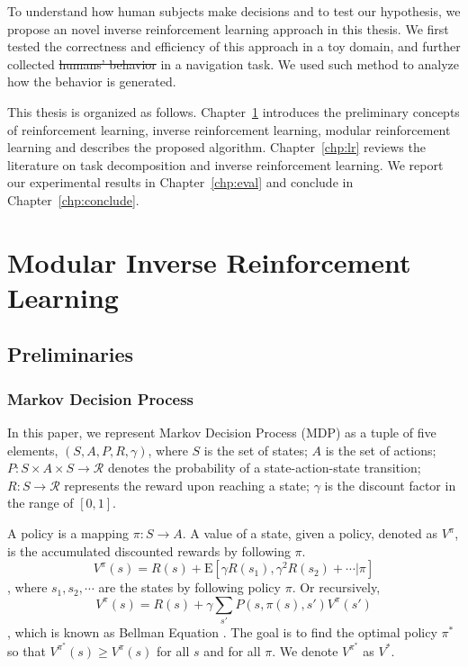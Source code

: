 \documentclass[12pt]{report}	%
\theoremstyle{definition}
\theoremstyle{remark}
\newcommand{\E}{\mathrm{E}}
\providecommand{\DIFadd}[1]{{\protect\color{blue}\uwave{#1}}} %
\providecommand{\DIFdel}[1]{{\protect\color{red}\sout{#1}}}                      %
\providecommand{\DIFaddbegin}{} %
\providecommand{\DIFaddend}{} %
\providecommand{\DIFdelbegin}{} %
\providecommand{\DIFdelend}{} %
\begin{document}
To understand how human subjects make decisions and to test our hypothesis, we
propose an novel inverse reinforcement learning approach in this thesis.
We first tested the correctness and efficiency of this approach in a toy domain,
and further collected \DIFdelbegin \DIFdel{humans' behavior }\DIFdelend \DIFaddbegin \DIFadd{human data }\DIFaddend in a navigation task. We used such method
to analyze how the behavior is generated.

This thesis is organized as follows. Chapter~\ref{chp:mirl} introduces the
preliminary concepts of reinforcement learning, inverse reinforcement learning,
modular reinforcement learning and describes the proposed algorithm.
Chapter~\ref{chp:lr} reviews the literature on task decomposition and inverse
reinforcement learning. We report our experimental results in
Chapter~\ref{chp:eval} and conclude in Chapter~\ref{chp:conclude}.


\chapter{Modular Inverse Reinforcement Learning}
\label{chp:mirl}
\section{Preliminaries}

\subsection{Markov Decision Process}

In this paper, we represent Markov Decision Process (MDP)
\cite{sutton1998introduction} as a tuple of
five elements, $(S, A, P, R, \gamma)$, where $S$ is the set of states; $A$ is
the set of actions; $P: S \times A \times S \rightarrow \mathcal{R}$ denotes the
probability of a state-action-state transition; $R: S \rightarrow
\mathcal{R}$ represents the reward upon reaching a state; $\gamma$ is the
discount factor in the range of $[0, 1]$.

A policy is a mapping $\pi: S \rightarrow A$. A value of a state, given a
policy, denoted as $V^\pi$, is the accumulated discounted rewards by following
$\pi$.
$$V^\pi(s) = R(s) + \E[\gamma R(s_1), \gamma^2 R(s_2) + \cdots | \pi]$$, where
$s_1, s_2, \cdots$ are the states by following policy $\pi$. Or recursively,
$$V^\pi(s) = R(s) + \gamma \sum_{s'} P(s, \pi(s), s')V^\pi(s')$$,
which is known as Bellman Equation \cite{sutton1998introduction}. The goal is to find the optimal
policy $\pi^*$ so that $V^{\pi^*}(s) \geq V^\pi(s)$ for all $s$ and for all
$\pi$. We denote $V^{\pi^*}$ as $V^*$.
\end{document}
